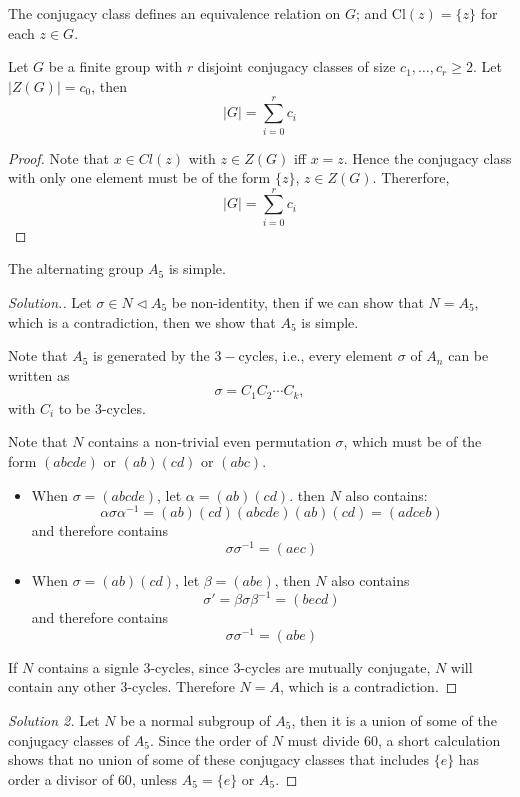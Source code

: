 \begin{proposition}
The conjugacy class defines an equivalence relation on $G$; and $\mbox{Cl}(z)=\{z\}$ for each $z\in G$.
\end{proposition}
\begin{theorem}
Let $G$ be a finite group with $r$ disjoint conjugacy classes of size $c_1,\dots,c_r\ge2$. Let $|Z(G)|=c_0$, then
\[
|G| = \sum_{i=0}^rc_i
\]
\end{theorem}
\begin{proof}
Note that $x\in Cl(z)$ with $z\in Z(G)$ iff $x=z$. Hence the conjugacy class with only one element must be of the form $\{z\}$, $z\in Z(G)$. Thererfore,
\[
|G|=\sum_{i=0}^rc_i
\]
\end{proof}

\begin{theorem}
The alternating group $A_5$ is simple.
\end{theorem}
\begin{proof}[Solution.]
Let $\sigma\in N\triangleleft A_5$ be non-identity, then if we can show that $N=A_5$, which is a contradiction, then we show that $A_5$ is simple.

Note that $A_5$ is generated by the $3-$cycles, i.e., every element $\sigma$ of $A_n$ can be written as
\[
\sigma=C_1C_2\cdots C_k,
\]
with $C_i$ to be $3$-cycles.

Note that $N$ contains a non-trivial even permutation $\sigma$, which must be of the form $(abcde)$ or $(ab)(cd)$ or $(abc)$.
\begin{itemize}
\item
When $\sigma=(abcde)$, let $\alpha = (ab)(cd)$. then $N$ also contains:
\[
\alpha\sigma\alpha^{-1}=(ab)(cd)(abcde)(ab)(cd)=(adceb)
\]
and therefore contains
\[
\sigma\sigma^{-1}=(aec)
\]
\item
When $\sigma=(ab)(cd)$, let $\beta=(abe)$, then $N$ also contains
\[
\sigma' =\beta\sigma\beta^{-1}=(becd)
\]
and therefore contains
\[
\sigma\sigma^{-1}=(abe)
\]
\end{itemize}
If $N$ contains a signle $3$-cycles, since $3$-cycles are mutually conjugate, $N$ will contain any other $3$-cycles. Therefore $N=A$, which is a contradiction.
\end{proof}
\begin{proof}[Solution 2]
Let $N$ be a normal subgroup of $A_5$, then it is a union of some of the conjugacy classes of $A_5$. Since the order of $N$ must divide $60$, a short calculation shows that no union of some of these conjugacy classes that includes $\{e\}$ has order a divisor of $60$, unless $A_5=\{e\}$ or $A_5$.
\end{proof}


















